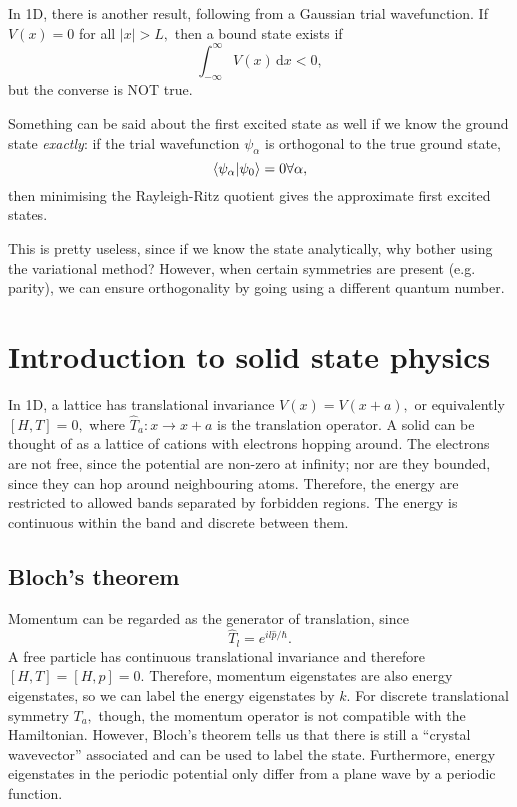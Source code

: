 \documentclass{article}
\theoremstyle{nonumberplain}
\begin{document}
In 1D, there is another result, following from a Gaussian trial wavefunction. If $V(x) = 0$ for all $\left\vert x \right\vert > L,$ then a bound state exists if 
\[
    \int_{-\infty}^{\infty} V(x) \,\mathrm{d}x < 0,
\]
but the converse is NOT true. 

Something can be said about the first excited state as well if we know the ground state \textit{exactly}: if the trial wavefunction $\psi_\alpha$ is orthogonal to the true ground state, 
\[
    \braket{\psi_\alpha}{\psi_0} = 0 \forall \alpha,
\]
then minimising the Rayleigh-Ritz quotient gives the approximate first excited states. 

This is pretty useless, since if we know the state analytically, why bother using the variational method? However, when certain symmetries are present (e.g. parity), we can ensure orthogonality by going using a different quantum number. 

\section{Introduction to solid state physics}
In 1D, a lattice has translational invariance $V(x) = V(x+a),$ or equivalently $[H,T] = 0,$ where $\hat{T}_a: x\to x+a$ is the translation operator. A solid can be thought of as a lattice of cations with electrons hopping around. The electrons are not free, since the potential are non-zero at infinity; nor are they bounded, since they can hop around neighbouring atoms. Therefore, the energy are restricted to allowed bands separated by forbidden regions. The energy is continuous within the band and discrete between them. 

\subsection{Bloch's theorem}
Momentum can be regarded as the generator of translation, since 
\[
    \hat{T}_l = e^{i l \hat{p} /\hbar }.
\]
A free particle has continuous translational invariance and therefore $[H, T] = [H,p] = 0.$ Therefore, momentum eigenstates are also energy eigenstates, so we can label the energy eigenstates by $k.$ For discrete translational symmetry $T_a,$ though, the momentum operator is not compatible with the Hamiltonian. However, Bloch's theorem tells us that there is still a ``crystal wavevector'' associated and can be used to label the state. Furthermore, energy eigenstates in the periodic potential only differ from a plane wave by a periodic function. 
\end{document}
